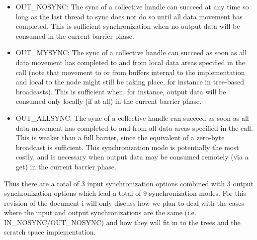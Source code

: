 \documentclass[times,10pt]{article}
\begin{document}
\begin{itemize}
\item OUT\_NOSYNC: The sync of a collective handle can succeed at any time
so long as the last thread to sync does not do so until all data
movement has completed.  This is sufficient synchronization when no
output data will be consumed in the current barrier phase.

\item OUT\_MYSYNC: The sync of a collective handle can succeed as soon as
all data movement has completed to and from local data areas
specified in the call (note that movement to or from buffers
internal to the implementation and local to the node might still be
taking place, for instance in tree-based broadcasts).  This is
sufficient when, for instance, output data will be consumed only
locally (if at all) in the current barrier phase.

\item OUT\_ALLSYNC: The sync of a collective handle can succeed as soon as
all data movement has completed to and from all data areas specified
in the call.  This is weaker than a full barrier, since the equivalent
of a zero-byte broadcast is sufficient.  This synchronization mode is
potentially the most costly, and is necessary when output data may be
consumed remotely (via a get) in the current barrier phase.
\end{itemize}

Thus there are a total of 3 input synchronization options combined with 3 output synchronization options which lead a total of 9 synchronization modes. For this revision of the document i will only discuss how we plan to deal with the cases where the input and output synchronizations are the same (i.e. IN\_NOSYNC/OUT\_NOSYNC) and how they will fit in to the trees and the scratch space implementation. 
\end{document}
